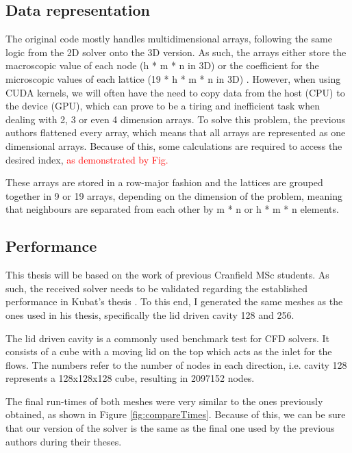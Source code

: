 \documentclass[12pt]{book}
\begin{document}
\subsection{Data representation}
The original code mostly handles multidimensional arrays, following the same logic from the 2D solver onto the 3D version. As such, the arrays either store the macroscopic value of each node (h * m * n in 3D) or the coefficient for the microscopic values of each lattice (19 * h * m * n in 3D) . However, when using CUDA kernels, we will often have the need to copy data from the host (CPU) to the device (GPU), which can prove to be a tiring and inefficient task when dealing with 2, 3 or even 4 dimension arrays. To solve this problem, the previous authors flattened every array, which means that all arrays are represented as one dimensional arrays. Because of this, some calculations are required to access the desired index, \textcolor{red}{as demonstrated by Fig.}
\par These arrays are stored in a row-major fashion and the lattices are grouped together in 9 or 19 arrays, depending on the dimension of the problem, meaning that neighbours are separated from each other by m * n or h * m * n elements.

\subsection{Performance}
This thesis will be based on the work of previous Cranfield MSc students. As such, the received solver needs to be validated regarding the established performance in Kubat’s thesis \cite{maciej_thesis}. To this end, I generated the same meshes as the ones used in his thesis, specifically the lid driven cavity 128 and 256. \par
The lid driven cavity is a commonly used benchmark test for CFD solvers. It consists of a cube with a moving lid on the top which acts as the inlet for the flows. The numbers refer to the number of nodes in each direction, i.e. cavity 128 represents a 128x128x128 cube, resulting in 2097152 nodes.
\par
The final run-times of both meshes were very similar to the ones previously obtained, as shown in Figure \ref{fig:compareTimes}. Because of this, we can be sure that our version of the solver is the same as the final one used by the previous authors during their theses. \par
\end{document}
